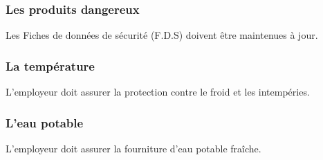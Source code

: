 \documentclass{beamer}
\begin{document}
\begin{frame}
\frametitle{Les produits dangereux}
Les  Fiches de données de sécurité (F.D.S) doivent être maintenues à jour.
\end{frame}

\begin{frame}
\frametitle{La température}
L’employeur doit assurer la protection contre le froid et les intempéries.
\end{frame}

\begin{frame}
\frametitle{L’eau potable}
L’employeur doit assurer la fourniture d’eau potable fraîche.
\end{frame}
\end{document}
